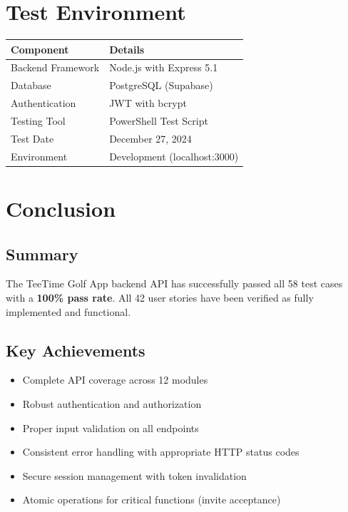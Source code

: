 \documentclass[11pt,a4paper]{article}
\begin{document}
\section{Test Environment}

\begin{tabular}{|l|l|}
\hline
\textbf{Component} & \textbf{Details} \\
\hline
Backend Framework & Node.js with Express 5.1 \\
\hline
Database & PostgreSQL (Supabase) \\
\hline
Authentication & JWT with bcrypt \\
\hline
Testing Tool & PowerShell Test Script \\
\hline
Test Date & December 27, 2024 \\
\hline
Environment & Development (localhost:3000) \\
\hline
\end{tabular}

\section{Conclusion}

\subsection{Summary}
The TeeTime Golf App backend API has successfully passed all 58 test cases with a \textbf{100\% pass rate}. All 42 user stories have been verified as fully implemented and functional.

\subsection{Key Achievements}
\begin{itemize}
  \item Complete API coverage across 12 modules
  \item Robust authentication and authorization
  \item Proper input validation on all endpoints
  \item Consistent error handling with appropriate HTTP status codes
  \item Secure session management with token invalidation
  \item Atomic operations for critical functions (invite acceptance)
\end{itemize}
\end{document}
